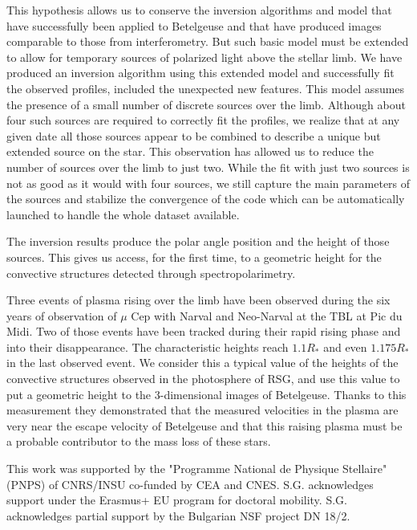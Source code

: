 \documentclass{/Users/art2/TeX/aanda/aa}
\begin{document}
This hypothesis allows us to conserve the inversion algorithms and model that have successfully been applied to Betelgeuse and that have produced images comparable to those from interferometry. But such basic model must be extended to allow for temporary sources of polarized light above the stellar limb. We have produced an inversion algorithm using this extended model and successfully fit the observed profiles, included the unexpected new features. This model assumes the presence of a small number of discrete sources over the limb. Although about four such sources are required to correctly fit the profiles, we realize that at any given date all those sources appear to be combined to describe a unique but extended source on the star. This observation has allowed us to reduce the number of sources over the limb to just two. While the fit with just two sources is not as good as it would with four sources, we still capture the main parameters of the sources and stabilize the convergence of the code which can be automatically launched to handle the whole dataset available.

The inversion results produce the polar angle position and the height of those sources. This gives us access, for the first time, to a geometric height for the convective structures detected through spectropolarimetry. 

Three events of plasma rising over the limb have been observed during the six years of observation of $\mu$ Cep with Narval and Neo-Narval at the TBL at Pic du Midi. Two of those events have been tracked during their rapid rising phase and into their disappearance. The characteristic heights reach  $1.1R_*$ and even $1.175R_*$ in the last observed event. We consider this a typical value of the heights of the convective structures observed in the photosphere of RSG, and \cite{LA22} use this value to put a geometric height to the 3-dimensional images of Betelgeuse. Thanks to this measurement they demonstrated that the measured velocities in the plasma are very near the escape velocity of Betelgeuse and that this raising plasma must be a probable contributor to the mass loss of these stars.

\begin{acknowledgements}
This work was supported by the "Programme National de Physique Stellaire" (PNPS) of CNRS/INSU co-funded by CEA and CNES.
S.G. acknowledges support under the Erasmus+ EU program for doctoral mobility. S.G. acknowledges partial support by the Bulgarian NSF project DN 18/2.
\end{acknowledgements}
\end{document}
